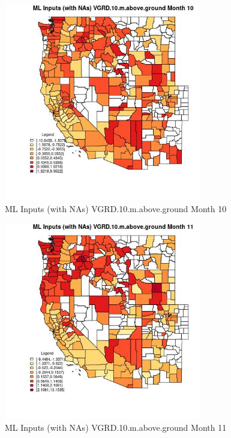 \begin{figure} 
\centering  
\includegraphics[width=0.77\textwidth]{Code_Outputs/Report_ML_input_PM25_Step4_part_f_de_duplicated_aveswNAs_CountyVGRD10mabovegroundmedianMonth10.jpg} 
\caption{\label{fig:Report_ML_input_PM25_Step4_part_f_de_duplicated_aveswNAsCountyVGRD10mabovegroundmedianMonth10}ML Inputs (with NAs) VGRD.10.m.above.ground Month 10} 
\end{figure} 
 

\clearpage 

\begin{figure} 
\centering  
\includegraphics[width=0.77\textwidth]{Code_Outputs/Report_ML_input_PM25_Step4_part_f_de_duplicated_aveswNAs_CountyVGRD10mabovegroundmedianMonth11.jpg} 
\caption{\label{fig:Report_ML_input_PM25_Step4_part_f_de_duplicated_aveswNAsCountyVGRD10mabovegroundmedianMonth11}ML Inputs (with NAs) VGRD.10.m.above.ground Month 11} 
\end{figure} 
 

